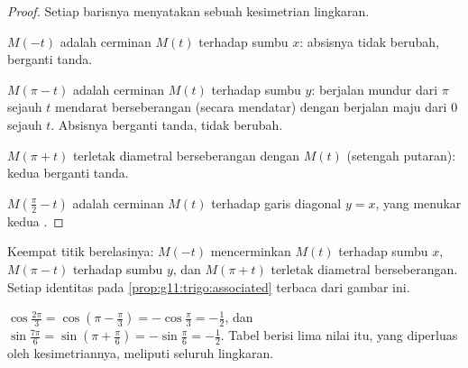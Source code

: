 \begin{proof}
Setiap barisnya menyatakan sebuah kesimetrian lingkaran.

$M(-t)$ adalah cerminan $M(t)$ terhadap sumbu $x$: absisnya
tidak berubah,  berganti tanda.

$M(\pi - t)$ adalah cerminan $M(t)$ terhadap sumbu $y$: berjalan
mundur dari $\pi$ sejauh $t$ mendarat berseberangan (secara mendatar) dengan
berjalan maju dari $0$ sejauh $t$. Absisnya berganti tanda, 
tidak berubah.

$M(\pi + t)$ terletak diametral berseberangan dengan $M(t)$ (setengah putaran):
kedua  berganti tanda.

$M\!\left(\frac\pi2 - t\right)$ adalah cerminan $M(t)$ terhadap
garis diagonal $y = x$, yang menukar kedua .
\end{proof}

\begin{omfigure}

{\small Keempat titik berelasinya: $M(-t)$ mencerminkan $M(t)$ terhadap
sumbu $x$, $M(\pi - t)$ terhadap sumbu $y$, dan $M(\pi + t)$ terletak diametral
berseberangan. Setiap identitas pada \cref{prop:g11:trigo:associated} terbaca
dari gambar ini.}
\end{omfigure}

\begin{example}
$\cos\frac{2\pi}{3} = \cos\left(\pi - \frac\pi3\right)
= -\cos\frac\pi3 = -\frac12$, dan
$\sin\frac{7\pi}{6} = \sin\left(\pi + \frac\pi6\right)
= -\sin\frac\pi6 = -\frac12$. Tabel berisi lima nilai itu, yang diperluas oleh
kesimetriannya, meliputi seluruh lingkaran.
\end{example}

